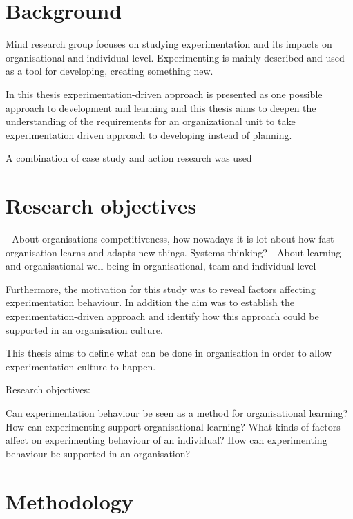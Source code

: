 \section{Background}
Mind research group focuses on studying experimentation and its impacts on organisational and individual level. Experimenting is mainly described and used as 
a tool for developing, creating something new. 

In this thesis experimentation-driven approach is presented as one possible approach to development and learning and this thesis aims to deepen the understanding of the requirements for an organizational unit to take experimentation driven approach to developing instead of planning. 

A combination of case study and action research was used 

\section{Research objectives}
- About organisations competitiveness, how nowadays it is lot about how fast organisation learns and adapts new things. Systems thinking? 
- About learning and organisational well-being in organisational, team and individual level

Furthermore, the motivation for this study was to reveal factors affecting experimentation behaviour. In addition the aim was to establish 
the experimentation-driven approach and identify how this approach could be supported in an organisation culture. 

This thesis aims to define what can be done in organisation in order to allow experimentation culture to happen. 

Research objectives: 

Can experimentation behaviour be seen as a method for organisational learning? 
How can experimenting support organisational learning? 
What kinds of factors affect on experimenting behaviour of an individual? 
How can experimenting behaviour be supported in an organisation? 

\section{Methodology}

